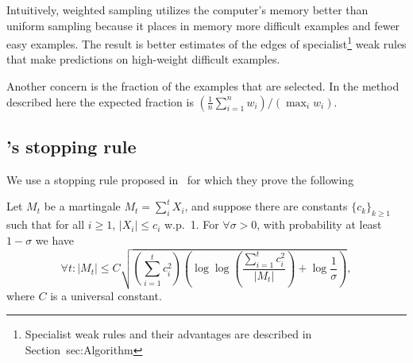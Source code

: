 Intuitively, weighted sampling utilizes the computer's memory better
than uniform sampling because it places in memory more difficult
examples and fewer easy examples. The result is better estimates of
the edges of specialist\footnote{Specialist weak rules and their
  advantages are described in Section~{sec:Algorithm}} weak rules that
make predictions on high-weight difficult examples.


Another concern is the fraction of the examples that are selected. In
the method described here the expected fraction is $(\frac{1}{n}
\sum_{i=1}^n w_i)/(\max_i w_i)$.

\subsection{\Sparrow's stopping rule} \label{sec:balsubramani}

We use a stopping rule proposed in~\cite{balsubramani_sharp_2014}
for which they prove the following

\begin{theorem} \label{thm:balsubramani}
  Let $M_t$ be a martingale $M_t = \sum_i^t X_i$,
  and suppose there are constants $\{c_k\}_{k \geq 1}$ such that
  for all $i \geq 1$, $|X_i| \leq c_i$ w.p.\ 1.
  For $\forall \sigma > 0$, with probability at least $1 - \sigma$ we have
  \[
  \forall t: |M_t| \leq C \sqrt{
    \left( \sum_{i=1}^t c_i^2 \right)
    \left( \log \log \left( \frac{ \sum_{i=1}^t c_i^2 }{ |M_t| }\right) +
    \log \frac{1}{\sigma} \right)
  },
  \]
  where $C$ is a universal constant.
\end{theorem}
